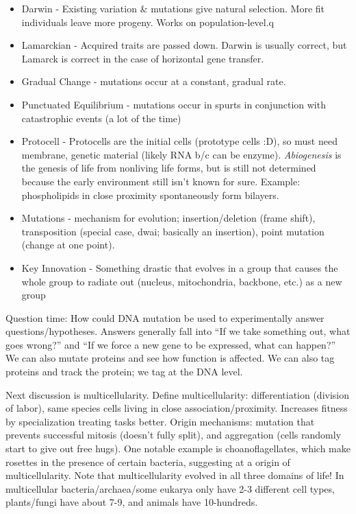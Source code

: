 \documentclass[12pt]{article}
\begin{document}
\begin{itemize}
	\item Darwin - Existing variation \& mutations give natural selection. More fit individuals leave more progeny. Works on population-level.q
	\item Lamarckian - Acquired traits are passed down. Darwin is usually correct, but Lamarck is correct in the case of horizontal gene transfer.
	\item Gradual Change - mutations occur at a constant, gradual rate.
	\item Punctuated Equilibrium - mutations occur in spurts in conjunction with catastrophic events (a lot of the time)
	\item Protocell - Protocells are the initial cells (prototype cells :D), so must need membrane, genetic material (likely RNA b/c can be enzyme). \emph{Abiogenesis} is the genesis of life from nonliving life forms, but is still not determined because the early environment still isn't known for sure. Example: phospholipids in close proximity spontaneously form bilayers. 
	\item Mutations - mechanism for evolution; insertion/deletion (frame shift), transposition (special case, dwai; basically an insertion), point mutation (change at one point). 
	\item Key Innovation - Something drastic that evolves in a group that causes the whole group to radiate out (nucleus, mitochondria, backbone, etc.) as a new group
\end{itemize}

Question time: How could DNA mutation be used to experimentally answer questions/hypotheses. Answers generally fall into ``If we take something out, what goes wrong?'' and ``If we force a new gene to be expressed, what can happen?'' We can also mutate proteins and see how function is affected. We can also tag proteins and track the protein; we tag at the DNA level.

Next discussion is multicellularity. Define multicellularity: differentiation (division of labor), same species cells living in close association/proximity. Increases fitness by specialization treating tasks better. Origin mechanisms: mutation that prevents successful mitosis (doesn't fully split), and aggregation (cells randomly start to give out free hugs). One notable example is choanoflagellates, which make rosettes in the presence of certain bacteria, suggesting at a origin of multicellularity. Note that multicellularity evolved in all three domains of life! In multicellular bacteria/archaea/some eukarya only have 2-3 different cell types, plants/fungi have about 7-9, and animals have 10-hundreds. 
\end{document}
